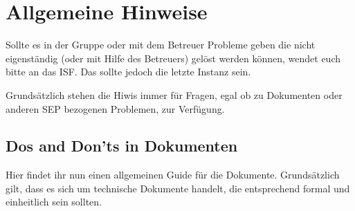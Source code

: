\chapter{Allgemeine Hinweise}
Sollte es in der Gruppe oder mit dem Betreuer Probleme geben die nicht eigenständig (oder mit Hilfe des Betreuers) gelöst werden können, wendet euch bitte an das ISF. Das sollte jedoch die letzte Instanz sein.
 
Grundsätzlich stehen die Hiwis immer für Fragen, egal ob zu Dokumenten oder anderen SEP bezogenen Problemen, zur Verfügung.

\section{Dos and Don'ts in Dokumenten}

Hier findet ihr nun einen allgemeinen Guide für die Dokumente. Grundsätzlich gilt, dass es sich um technische Dokumente handelt, die entsprechend formal
und einheitlich sein sollten.

